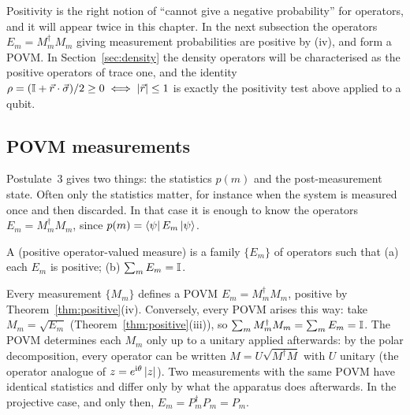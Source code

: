 \begin{lookahead}
  Positivity is the right notion of ``cannot give a negative probability'' for operators, and it will appear twice in this chapter. In the next subsection the operators $E_m=M_m^\dagger M_m$ giving measurement probabilities are positive by (iv), and form a POVM. In Section~\ref{sec:density} the density operators will be characterised as the positive operators of trace one, and the identity $\rho=(\mathbb{I}+\vec r\cdot\vec\sigma)/2\ge0\iff\left|\vec r\right|\le1$ is exactly the positivity test above applied to a qubit.
\end{lookahead}

\subsection{POVM measurements}

Postulate~3 gives two things: the statistics $p(m)$ and the post-measurement state. Often only the statistics matter, for instance when the system is measured once and then discarded. In that case it is enough to know the operators $E_m=M_m^\dagger M_m$, since $p(m)=\left\langle\psi\right| E_m\left|\psi\right\rangle$.

\begin{definition}[POVM]\label{def:povm}
  A  (positive operator-valued measure) is a family $\{E_m\}$ of operators such that (a) each $E_m$ is positive; (b) $\sum_mE_m=\mathbb{I}$.
\end{definition}

Every measurement $\{M_m\}$ defines a POVM $E_m=M_m^\dagger M_m$, positive by Theorem~\ref{thm:positive}(iv). Conversely, every POVM arises this way: take $M_m=\sqrt{E_m}$ (Theorem~\ref{thm:positive}(iii)), so $\sum_mM_m^\dagger M_m=\sum_mE_m=\mathbb{I}$. The POVM determines each $M_m$ only up to a unitary applied afterwards: by the polar decomposition,
every operator can be written $M=U\sqrt{M^\dagger M}$ with $U$ unitary (the operator analogue of $z=e^{\mathrm{i}\theta}\left|z\right|$). Two measurements with the same POVM have identical statistics and differ only by what the apparatus does afterwards. In the projective case, and only then, $E_m=P_m^\dagger P_m=P_m$.

